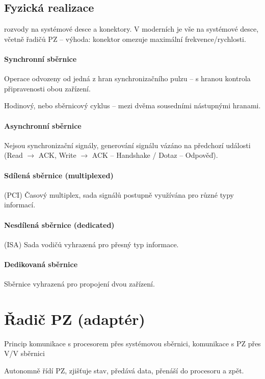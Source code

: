 \documentclass[a4wide]{report}
\begin{document}
\subsection{Fyzická realizace} rozvody na systémové desce a konektory. V moderních je vše na systémové desce, včetně řadičů PZ -- výhoda: konektor omezuje maximální frekvence/rychlosti.

\paragraph{Synchronní sběrnice}
Operace odvozeny od jedná z hran synchronizačního pulzu -- s hranou kontrola připravenosti obou zařízení.

Hodinový, nebo sběrnicový cyklus -- mezi dvěma sousedními nástupnými hranami.

\paragraph{Asynchronní sběrnice}
Nejsou synchronizační signály, generování signálu vázáno na předchozí události (Read $\to$ ACK, Write $\to$ ACK -- Handshake / Dotaz -- Odpověď).

\paragraph{Sdílená sběrnice (multiplexed)} (PCI)
Časový multiplex, sada signálů postupně využívána pro různé typy informací.

\paragraph{Nesdílená sběrnice (dedicated)} (ISA)
Sada vodičů vyhrazená pro přesný typ informace.

\paragraph{Dedikovaná sběrnice}
Sběrnice vyhrazená pro propojení dvou zařízení.




\section{Řadič PZ (adaptér)}

Princip komunikace s procesorem přes systémovou sběrnici, komunikace s PZ přes V/V sběrnici

Autonomně řídí PZ, zjišťuje stav, předává data, přenáší do procesoru a zpět.
\end{document}
